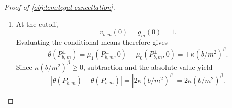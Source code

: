 \begin{proof}[Proof of \cref{obj:lem:legal-cancellation}]
\begin{enumerate}
The construction in \cref{obj:def:alternatives} uses an independent Gaussian factor. Its Gaussian marginal and product structure give
\[
\varepsilon\sim N(0,1),
\qquad
\varepsilon\perp(X,Y^0,Y^1),
\]
as required by \cref{obj:ass:gaussian,obj:ass:error-independence}. The uniform score and binary Bernoulli outcomes give the latent support in \cref{obj:def:model}. Moreover,
\[
f(P^\pm_{b,m},x)=\frac12
\qquad(x\in[-1,1]),
\qquad
\int_{-1}^1f(P^\pm_{b,m},x)\,dx=1.
\]
This density is continuous on the latent interval and satisfies \cref{obj:ass:density-bounds}. The conditional Bernoulli means are
\[
\mu_0(P^\pm_{b,m},x)=\frac12,
\qquad
\mu_1(P^\pm_{b,m},x)=p_\pm(x),
\]
which are continuous and satisfy \cref{obj:ass:mean-bounds}.

For distinct \(x,t\in[-1,1]\), the preceding Hölder estimate gives
\[
\begin{aligned}
|p_\pm(x)-p_\pm(t)|
&=\kappa(b/m^2)^\beta
|v_{b,m}(x)-v_{b,m}(t)|\\
&\le7\kappa(b/m^2)^\beta(b/m^2)^{-\beta}|x-t|^\beta\\
&=\frac7{100}|x-t|^\beta
\le2|x-t|^\beta,
\end{aligned}
\]
where
\[
(b/m^2)^\beta(b/m^2)^{-\beta}=1
\]
because \(b/m^2>0\). When \(x=t\), the same inequality follows from the zero difference. The untreated mean is constant, so
\[
[\mu_0(P^\pm_{b,m},\cdot)]_\beta=0,
\qquad
[\mu_1(P^\pm_{b,m},\cdot)]_\beta\le\frac7{100}\le2.
\]
Thus \cref{obj:ass:mean-holder} holds, completing all conditions of \cref{obj:def:model} for each sign and every \(\sigma\in\mathbb R\):
\[
P^\pm_{b,m}\in\mathcal M_\beta(\sigma).
\]

\item At the cutoff,
\[
v_{b,m}(0)=g_m(0)=1.
\]
Evaluating the conditional means therefore gives
\[
\theta(P^\pm_{b,m})
=\mu_1(P^\pm_{b,m},0)-\mu_0(P^\pm_{b,m},0)
=\pm\kappa(b/m^2)^\beta.
\]
Since \(\kappa(b/m^2)^\beta\ge0\), subtraction and the absolute value yield
\[
\left|\theta(P^+_{b,m})-\theta(P^-_{b,m})\right|
=\left|2\kappa(b/m^2)^\beta\right|
=2\kappa(b/m^2)^\beta.
\]
\end{enumerate}
\end{proof}
